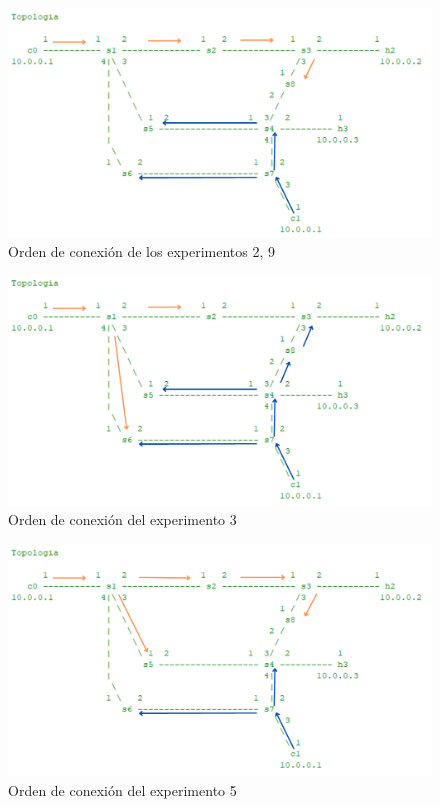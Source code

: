 \documentclass[a4paper, 12pt]{book}
\begin{document}
	\begin{figure}
		\centering
		\includegraphics[width=16cm, keepaspectratio]{img/escenario1_2c_2}
		\caption{Orden de conexión de los experimentos 2, 9}
		\label{figura:escenario1_2c_2}
	\end{figure}
	
	\begin{figure}
		\centering
		\includegraphics[width=16cm, keepaspectratio]{img/escenario1_2c_3}
		\caption{Orden de conexión del experimento 3}
		\label{figura:escenario_2c_3}
	\end{figure}
	
	\begin{figure}
		\centering
		\includegraphics[width=16cm, keepaspectratio]{img/escenario1_2c_4}
		\caption{Orden de conexión del experimento 5}
		\label{figura:escenario1_2c_4}
	\end{figure}
	
\end{document}
